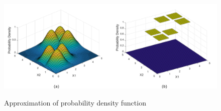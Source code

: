\begin{enumerate}
\begin{figure}[t]
\centering
   \includegraphics[height=0.4\columnwidth]{Figures/pdf.pdf}
   \label{fig:pdf}
   \caption{Approximation of probability density function}
\end{figure}


\end{enumerate}